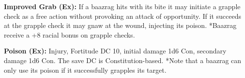 \textbf{Improved Grab (Ex):} If a baazrag hits with its bite it may initiate a grapple check as a free action without provoking an attack of opportunity. If it succeeds at the grapple check it may gnaw at the wound, injecting its poison. *Baazrag receive a +8 racial bonus on grapple checks.

\textbf{Poison (Ex):} Injury, Fortitude DC 10, initial damage 1d6 Con, secondary damage 1d6 Con. The save DC is Constitution-based. *Note that a baazrag can only use its poison if it successfully grapples its target.
